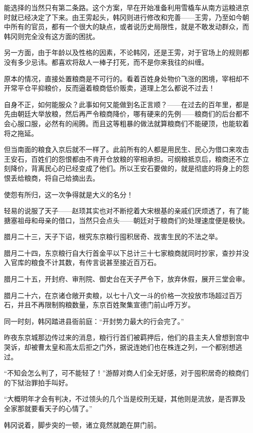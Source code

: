 能选择的当然只有第二条路。这个方案，早在开始准备利用雪橇车从南方运粮进京时就已经决定了下来。由王雱起头，韩冈则进行修改和完善——王雱，乃至如今朝中所有的官员，都有一个很大的缺点，或者说历史局限性，就是不敢发动群众，而韩冈则完全没有这方面的困扰。

另一方面，由于年龄以及性格的因素，不论韩冈，还是王雱，对于官场上的规则都没有多少忌讳。都喜欢将敌人一棒子打死，而不是你来我往的纠缠。

原本的情况，直接处置粮商是不可行的。看着百姓身处物价飞涨的困境，宰相却不开常平仓平抑粮价，反而逼着粮商低价贩卖，道理上怎么都说不过去！

自身不正，如何能服众？此事如何又能做到名正言顺？——在过去的百年里，都是先由朝廷大举放粮，然后再严令粮商降价，哪有硬来的先例——粮商们的后台都不会心服口服，必然有的闹腾。而且这等粗暴的做法就算粮商们不能硬顶，也能软着将之拖延。

但当南面的粮食入京后就不一样了。此前所有的人都是用民生、民心为借口来攻击王安石，百姓们的怨恨都由不肯开仓放粮的宰相承担。可纲粮抵京后，粮商还不立刻降价，背离民心的已经变成了他们。所以王安石要做的，就是彻底的将身上的怨恨丢给粮商，将自己给摘出去。

使怨有所归，这一次争得就是大义的名分！

轻易的说服了天子——赵顼其实也对不断挖着大宋根基的亲戚们厌烦透了，有了能搪塞祖母和母亲的借口，当然只会点头——朝廷对于粮商们的处理速度便是极快。

腊月二十三，天子下诏，根究东京粮行囤积居奇、戕害生民的不法之举。

腊月二十四，东京粮行自大行首金平以下总计三十七家粮商就同时抄家，查抄并没入官库的粮食不计其数，有传言说甚至接近百万石。

腊月二十五，开封府、审刑院、御史台在天子严令下，放弃休假，展开三堂会审。

腊月二十六，在京诸仓敞开卖粮，以七十八文一斗的价格一次投放市场超过百万石，并且不再限制购粮数量，东京百姓聚集宣德门前山呼万岁。

同一时刻，韩冈踏进县衙前庭：“开封势力最大的行会完了。”

昨夜东京城那边传过来的消息，粮行行首们被羁押后，他们的县主夫人曾想到宫中哭诉，却被曹太皇和高太后拒之门外，据说连她们也在株连之列，一个都别想逃过。

“不知会怎么判了，可不能轻了！”游醇对商人们全无好感，对于囤积居奇的粮商们的下狱治罪拍手叫好。

“大概明年才会有判决，不过领头的几个当是绞刑无疑，其他则是流放，是否罪及全家那就要看天子的心情了。”

韩冈说着，脚步突的一顿，诸立竟然就跪在屏门前。

